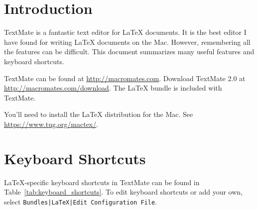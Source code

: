 \documentclass[10pt]{article}
\begin{document}
\maketitle

\begin{abstract}
TextMate is a fantastic editor for \LaTeX{} documents. 
This short paper summarizes many features, including
keyboard shortcuts, 
typsetting, and 
GitHub integration,
available in TextMate's \LaTeX{} bundle.
\end{abstract}

\section{Introduction}
TextMate is a fantastic text editor for \LaTeX{} documents.
It is the best editor I have found for
writing \LaTeX{} documents on the Mac.
However, remembering all the features can be difficult.
This document summarizes many useful features and keyboard shortcuts.

TextMate can be found at \url{http://macromates.com}. 
Download TextMate 2.0 at \url{http://macromates.com/download}. 
The \LaTeX{} bundle is included with TextMate. 

You'll need to install the \LaTeX{} distribution for the Mac.
See \url{https://www.tug.org/mactex/}.


\section{Keyboard Shortcuts} %
\label{sec:keyboard_shortcuts}
\LaTeX{}-specific keyboard shortcuts in TextMate can be found in Table~\ref{tab:keyboard_shortcuts}.
To edit keyboard shortcuts or add your own, select
\texttt{Bundles|LaTeX|Edit Configuration File}.
\end{document}

